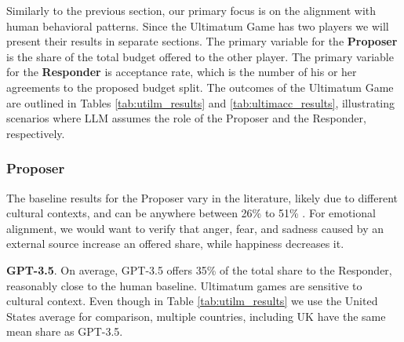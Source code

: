 \documentclass{article}
\begin{document}


Similarly to the previous section, our primary focus is on the alignment with human behavioral patterns. Since the Ultimatum Game has two players we will present their results in separate sections. The primary variable for the \textbf{Proposer} is the share of the total budget offered to the other player. The primary variable for the \textbf{Responder} is acceptance rate, which is the number of his or her agreements to the proposed budget split. The outcomes of the Ultimatum Game are outlined in Tables \ref{tab:utilm_results} and \ref{tab:ultimacc_results}, illustrating scenarios where LLM assumes the role of the Proposer and the Responder, respectively.

\subsubsection{Proposer}
The baseline results for the Proposer vary in the literature, likely due to different cultural contexts, and can be anywhere between 26\% to 51\% \cite{hessRePEc:wpa:wuwpex:0401003}. For emotional alignment, we would want to verify that anger, fear, and sadness caused by an external source increase an offered share, while happiness decreases it. 

\textbf{GPT-3.5}. On average, GPT-3.5 offers 35\% of the total share to the Responder, reasonably close to the human baseline. Ultimatum games are sensitive to cultural context. Even though in Table \ref{tab:utilm_results} we use the United States average for comparison, multiple countries, including UK \cite{hessRePEc:wpa:wuwpex:0401003} have the same mean share as GPT-3.5.
\end{document}
